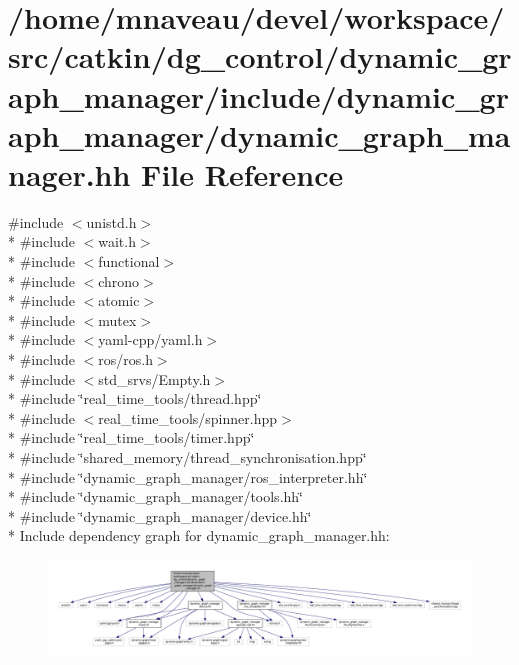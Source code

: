 \hypertarget{dynamic__graph__manager_8hh}{}\section{/home/mnaveau/devel/workspace/src/catkin/dg\+\_\+control/dynamic\+\_\+graph\+\_\+manager/include/dynamic\+\_\+graph\+\_\+manager/dynamic\+\_\+graph\+\_\+manager.hh File Reference}
\label{dynamic__graph__manager_8hh}
{\ttfamily \#include $<$unistd.\+h$>$}\\*
{\ttfamily \#include $<$wait.\+h$>$}\\*
{\ttfamily \#include $<$functional$>$}\\*
{\ttfamily \#include $<$chrono$>$}\\*
{\ttfamily \#include $<$atomic$>$}\\*
{\ttfamily \#include $<$mutex$>$}\\*
{\ttfamily \#include $<$yaml-\/cpp/yaml.\+h$>$}\\*
{\ttfamily \#include $<$ros/ros.\+h$>$}\\*
{\ttfamily \#include $<$std\+\_\+srvs/\+Empty.\+h$>$}\\*
{\ttfamily \#include \char`\"{}real\+\_\+time\+\_\+tools/thread.\+hpp\char`\"{}}\\*
{\ttfamily \#include $<$real\+\_\+time\+\_\+tools/spinner.\+hpp$>$}\\*
{\ttfamily \#include \char`\"{}real\+\_\+time\+\_\+tools/timer.\+hpp\char`\"{}}\\*
{\ttfamily \#include \char`\"{}shared\+\_\+memory/thread\+\_\+synchronisation.\+hpp\char`\"{}}\\*
{\ttfamily \#include \char`\"{}dynamic\+\_\+graph\+\_\+manager/ros\+\_\+interpreter.\+hh\char`\"{}}\\*
{\ttfamily \#include \char`\"{}dynamic\+\_\+graph\+\_\+manager/tools.\+hh\char`\"{}}\\*
{\ttfamily \#include \char`\"{}dynamic\+\_\+graph\+\_\+manager/device.\+hh\char`\"{}}\\*
Include dependency graph for dynamic\+\_\+graph\+\_\+manager.\+hh\+:\nopagebreak
\begin{figure}[H]
\begin{center}
\leavevmode
\includegraphics[width=350pt]{dynamic__graph__manager_8hh__incl}
\end{center}
\end{figure}
